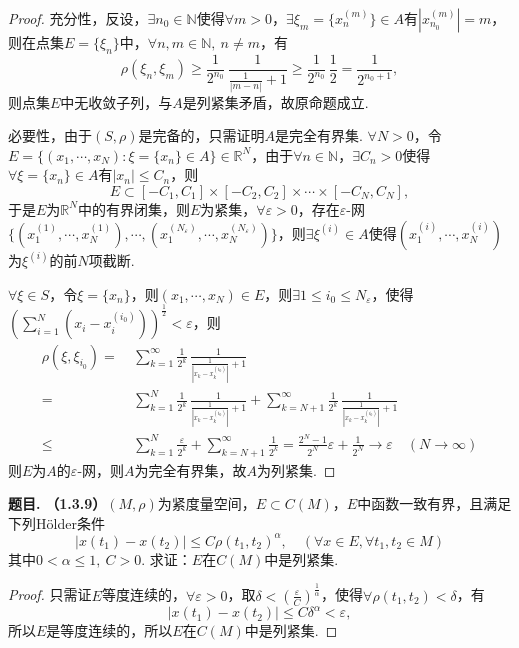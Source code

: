 \documentclass[12pt, a4paper, oneside]{ctexart}
\newcounter{problem}  %
\newenvironment{problem}{\stepcounter{problem}\par\noindent\textbf{题目\arabic{problem}. }}{\smallskip\par}
\let\leq=\leqslant %
\let\geq=\geqslant %
\def\R{\mathbb{R}}          %
\def\N{\mathbb{N}}          %
\begin{document}
\begin{proof}
    充分性，反设，$\exists n_0\in \N$使得$\forall m > 0$，$\exists \xi_m = \{x_n^{(m)}\}\in A$有$|x_{n_0}^{(m)}| = m$，则在点集$E = \{\xi_n\}$中，$\forall n, m \in\N,\ n\neq m$，有
    \begin{equation*}
        \rho(\xi_n,\xi_m) \geq \frac{1}{2^{n_0}}\,\frac{1}{\frac{1}{|m-n|}+1}\geq \frac{1}{2^{n_0}}\,\frac{1}{2} = \frac{1}{2^{n_0+1}},
    \end{equation*}
    则点集$E$中无收敛子列，与$A$是列紧集矛盾，故原命题成立.

    必要性，由于$(S, \rho)$是完备的，只需证明$A$是完全有界集. $\forall N > 0$，令$E = \{(x_1,\cdots, x_N):\xi=\{x_n\}\in A\}\in \R^N$，由于$\forall n\in \N$，$\exists C_n > 0$使得$\forall \xi = \{x_n\}\in A$有$|x_n|\leq C_n$，则
    \begin{equation*}
        E\subset [-C_1,C_1]\times [-C_2,C_2]\times \cdots \times [-C_N,C_N],
    \end{equation*}
    于是$E$为$\R^N$中的有界闭集，则$E$为紧集，$\forall \varepsilon > 0$，存在$\varepsilon$-网$\{(x_1^{(1)}, \cdots, x_N^{(1)}),\cdots, (x_1^{(N_\varepsilon)}, \cdots, x_N^{(N_\varepsilon)})\}$，则$\exists \xi^{(i)}\in A$使得$(x_1^{(i)},\cdots,x_N^{(i)})$为$\xi^{(i)}$的前$N$项截断.

    $\forall \xi \in S$，令$\xi = \{x_n\}$，则$(x_1,\cdots, x_N)\in E$，则$\exists 1\leq i_0\leq N_\varepsilon$，使得$\left(\sum_{i=1}^N(x_i-x_i^{(i_0)})\right)^{\frac{1}{2}} < \varepsilon$，则
    \begin{align*}
        \rho(\xi, \xi_{i_0}) =&\ \sum_{k=1}^{\infty}\frac{1}{2^k}\,\frac{1}{\frac{1}{|x_k-x_k^{(i_0)}|}+1}\\
        =&\ \sum_{k=1}^N\frac{1}{2^k}\,\frac{1}{\frac{1}{|x_k-x_k^{(i_0)}|}+1}+\sum_{k=N+1}^\infty\frac{1}{2^k}\,\frac{1}{\frac{1}{|x_k-x_k^{(i_0)}|}+1}\\
        \leq&\ \sum_{k=1}^N\frac{\varepsilon}{2^k}+\sum_{k=N+1}^\infty \frac{1}{2^k} = \frac{2^N-1}{2^N}\varepsilon+\frac{1}{2^{N}}\to\varepsilon\quad(N\to\infty)
    \end{align*}
    则$E$为$A$的$\varepsilon$-网，则$A$为完全有界集，故$A$为列紧集.
\end{proof}
\begin{problem}
    \textbf{（1.3.9）}$(M,\rho)$为紧度量空间，$E\subset C(M)$，$E$中函数一致有界，且满足下列Hölder条件
    \begin{equation*}
        |x(t_1)-x(t_2)|\leq C\rho(t_1,t_2)^\alpha,\quad(\forall x\in E,\forall t_1,t_2\in M)
    \end{equation*}
    其中$0 < \alpha \leq 1,\ C>0$. 求证：$E$在$C(M)$中是列紧集.
\end{problem}
\begin{proof}
    只需证$E$等度连续的，$\forall \varepsilon > 0$，取$\delta < \left(\frac{\varepsilon}{C}\right)^{\frac{1}{\alpha}}$，使得$\forall \rho(t_1,t_2) < \delta$，有
    \begin{equation*}
        |x(t_1)-x(t_2)|\leq C\delta^\alpha < \varepsilon,
    \end{equation*}
    所以$E$是等度连续的，所以$E$在$C(M)$中是列紧集.
\end{proof}
\end{document}
